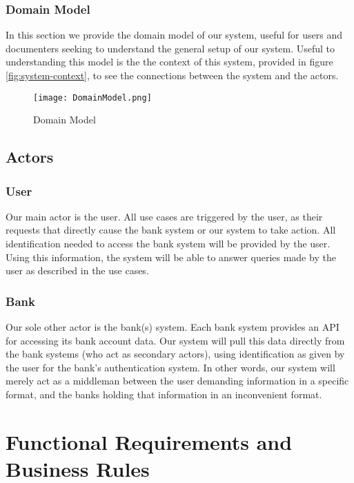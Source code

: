 \documentclass[11pt]{article}
\newcounter{use case ID}
\newcounter{req ID}
\begin{document}
\subsubsection{Domain Model}

In this section we provide the domain model of our system, useful for users and documenters seeking to understand the general setup of our system. Useful to understanding this model is the the context of this system, provided in figure \ref{fig:system-context}, to see the connections between the system and the actors. 

\begin{figure}[H]
\texttt{[image: DomainModel.png]}
\centering
\caption{Domain Model}
\label{fig:domain-model}
\end{figure}

\clearpage


\subsection{Actors} \label{actors}
\subsubsection{User}
Our main actor is the user. All use cases are triggered by the user, as their requests that directly cause the bank system or our system to take action. All identification needed to access the bank system will be provided by the user. Using this information, the system will be able to answer queries made by the user as described in the use cases.
\subsubsection{Bank}
Our sole other actor is the bank(s) system. Each bank system provides an API for accessing its bank account data. Our system will pull this data directly from the bank systems (who act as secondary actors), using identification as given by the user for the bank's authentication system. In other words, our system will merely act as a middleman between the user demanding information in a specific format, and the banks holding that information in an inconvenient format.


\section{Functional Requirements and Business Rules} \label{nonfunc req}
\end{document}
